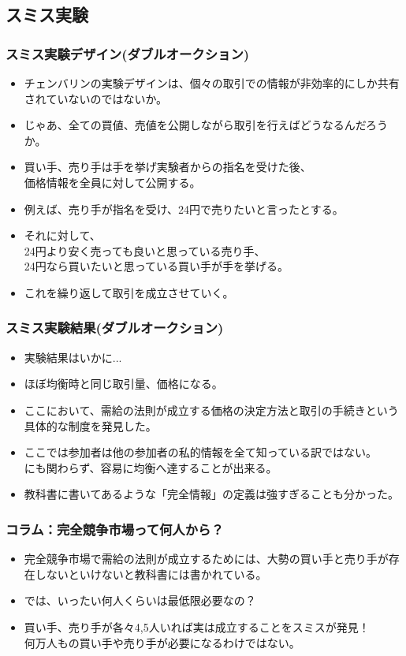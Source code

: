 \documentclass[dvipdfmx,12pt]{beamer}
\begin{document}
\subsection{スミス実験}
\begin{frame}
\frametitle{スミス実験デザイン(ダブルオークション)}
\begin{itemize}\setlength{\parskip}{0.5em}
\item
チェンバリンの実験デザインは、個々の取引での情報が非効率的にしか共有されていないのではないか。\pause
\item
じゃあ、全ての買値、売値を公開しながら取引を行えばどうなるんだろうか。\pause
\item
買い手、売り手は手を挙げ実験者からの指名を受けた後、\\
価格情報を全員に対して公開する。\pause
\item
例えば、売り手が指名を受け、24円で売りたいと言ったとする。\pause
\item
それに対して、\\
24円より安く売っても良いと思っている売り手、\\
24円なら買いたいと思っている買い手が手を挙げる。\pause
\item
これを繰り返して取引を成立させていく。
\end{itemize}
\end{frame}

\begin{frame}
\frametitle{スミス実験結果(ダブルオークション)}
\begin{itemize}\setlength{\parskip}{0.5em}
\item
実験結果はいかに...\pause
\item
ほぼ均衡時と同じ取引量、価格になる。\pause
\item
ここにおいて、需給の法則が成立する価格の決定方法と取引の手続きという具体的な制度を発見した。\pause
\item
ここでは参加者は他の参加者の私的情報を全て知っている訳ではない。\\
にも関わらず、容易に均衡へ達することが出来る。\pause
\item
教科書に書いてあるような「完全情報」の定義は強すぎることも分かった。\\
\end{itemize}
\end{frame}

\begin{frame}
\frametitle{コラム：完全競争市場って何人から？}
\begin{itemize}\setlength{\parskip}{0.5em}
\item
完全競争市場で需給の法則が成立するためには、大勢の買い手と売り手が存在しないといけないと教科書には書かれている。\pause
\item
では、いったい何人くらいは最低限必要なの？\pause
\item
買い手、売り手が各々4,5人いれば実は成立することをスミスが発見！\\
何万人もの買い手や売り手が必要になるわけではない。
\end{itemize}
\end{frame}
\end{document}

